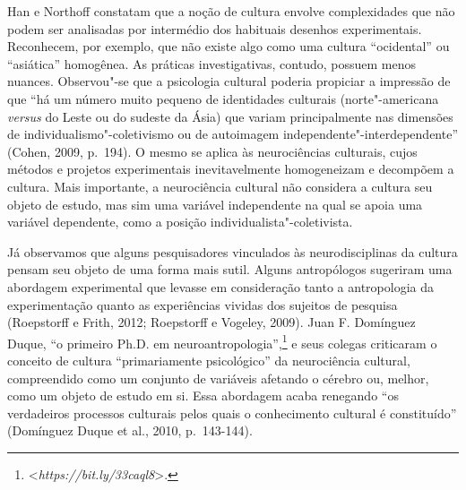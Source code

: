 Han e Northoff constatam que a noção de cultura envolve complexidades
que não podem ser analisadas por intermédio dos habituais desenhos
experimentais. Reconhecem, por exemplo, que não existe algo como uma
cultura ``ocidental'' ou ``asiática'' homogênea. As práticas
investigativas, contudo, possuem menos nuances. Observou"-se que a
psicologia cultural poderia propiciar a impressão de que ``há um número
muito pequeno de identidades culturais (norte"-americana \emph{versus} do
Leste ou do sudeste da Ásia) que variam principalmente nas dimensões de
individualismo"-coletivismo ou de autoimagem
independente"-interdependente'' (Cohen, 2009, p.~194). O mesmo se aplica
às neurociências culturais, cujos métodos e projetos experimentais
inevitavelmente homogeneizam e decompõem a cultura. Mais importante, a
neurociência cultural não considera a cultura seu objeto de estudo, mas
sim uma variável independente na qual se apoia uma variável dependente,
como a posição individualista"-coletivista.

Já observamos que alguns pesquisadores vinculados às neurodisciplinas da
cultura pensam seu objeto de uma forma mais sutil. Alguns antropólogos
sugeriram uma abordagem experimental que levasse em consideração tanto a
antropologia da experimentação quanto as experiências vividas dos
sujeitos de pesquisa (Roepstorff e Frith, 2012; Roepstorff e Vogeley,
2009). Juan F. Domínguez Duque, ``o primeiro Ph.D. em
neuroantropologia'',\footnote[13]{\textless{}\emph{https://bit.ly/33caql8}\textgreater{}.} e seus colegas criticaram o
conceito de cultura ``primariamente psicológico'' da neurociência
cultural, compreendido como um conjunto de variáveis afetando o cérebro
ou, melhor, como um objeto de estudo em si. Essa abordagem acaba
renegando ``os verdadeiros processos culturais pelos quais o
conhecimento cultural é constituído'' (Domínguez Duque et al., 2010,
p.~143-144).

